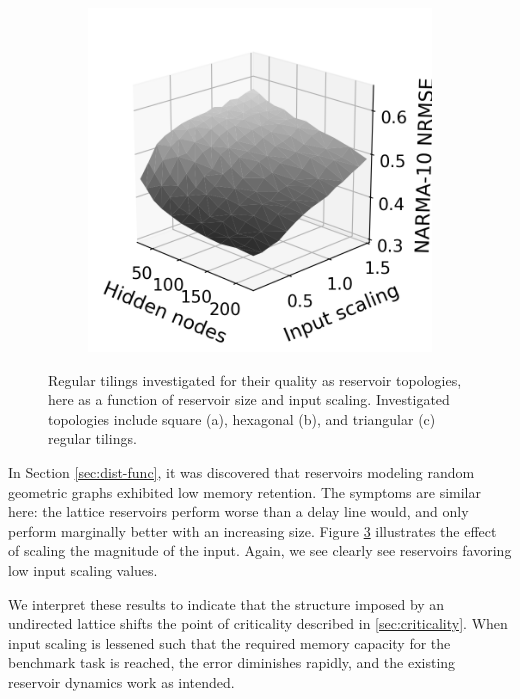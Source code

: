 \begin{figure}[htb]
\begin{subfigure}{.32\textwidth}
    \caption{}
    \label{fig:rt-is-hex}
  \end{subfigure}
  \begin{subfigure}{.32\textwidth}
    \centering
    \includegraphics[width=1.0\linewidth]{figures/regular-tilings-performance-is-tri.png}
    \caption{}
    \label{fi:rt-is-tri}
  \end{subfigure}
  \caption{
    Regular tilings investigated for their quality as reservoir topologies, here
as a function of reservoir size and input scaling. Investigated topologies
include square (a), hexagonal (b), and triangular (c) regular tilings.
  }
  \label{fig:rt-performance-is}
\end{figure}

In Section \ref{sec:dist-func}, it was discovered that reservoirs modeling
random geometric graphs exhibited low memory retention. The symptoms are similar
here: the lattice reservoirs perform worse than a delay line would, and only
perform marginally better with an increasing size. Figure
\ref{fig:rt-performance-is} illustrates the effect of scaling the magnitude of
the input. Again, we see clearly see reservoirs favoring low input scaling
values.

We interpret these results to indicate that the structure imposed by an
undirected lattice shifts the point of criticality described in
\ref{sec:criticality}. When input scaling is lessened such that the required
memory capacity for the benchmark task is reached, the error diminishes rapidly,
and the existing reservoir dynamics work as intended.

